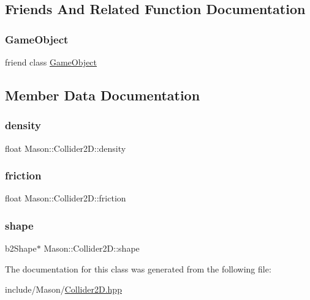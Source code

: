 \subsection{Friends And Related Function Documentation}
\hypertarget{class_mason_1_1_collider2_d_a00df87c957d8f7ee0fc51f07a0542f4a}{}\label{class_mason_1_1_collider2_d_a00df87c957d8f7ee0fc51f07a0542f4a} 
\subsubsection{\texorpdfstring{Game\+Object}{GameObject}}
{\footnotesize\ttfamily friend class \hyperlink{class_mason_1_1_game_object}{Game\+Object}\hspace{0.3cm}{\ttfamily [friend]}}



\subsection{Member Data Documentation}
\hypertarget{class_mason_1_1_collider2_d_ad3b9178c829dbe0a8a25a75d643f8744}{}\label{class_mason_1_1_collider2_d_ad3b9178c829dbe0a8a25a75d643f8744} 
\subsubsection{\texorpdfstring{density}{density}}
{\footnotesize\ttfamily float Mason\+::\+Collider2\+D\+::density}

\hypertarget{class_mason_1_1_collider2_d_ab08954cffa1ac7539e26c4e2da535481}{}\label{class_mason_1_1_collider2_d_ab08954cffa1ac7539e26c4e2da535481} 
\subsubsection{\texorpdfstring{friction}{friction}}
{\footnotesize\ttfamily float Mason\+::\+Collider2\+D\+::friction}

\hypertarget{class_mason_1_1_collider2_d_a82de033fe10f7da3fd079c7ff54eaf94}{}\label{class_mason_1_1_collider2_d_a82de033fe10f7da3fd079c7ff54eaf94} 
\subsubsection{\texorpdfstring{shape}{shape}}
{\footnotesize\ttfamily b2\+Shape$\ast$ Mason\+::\+Collider2\+D\+::shape}



The documentation for this class was generated from the following file\+:\begin{DoxyCompactItemize}
\item 
include/\+Mason/\hyperlink{_collider2_d_8hpp}{Collider2\+D.\+hpp}\end{DoxyCompactItemize}
